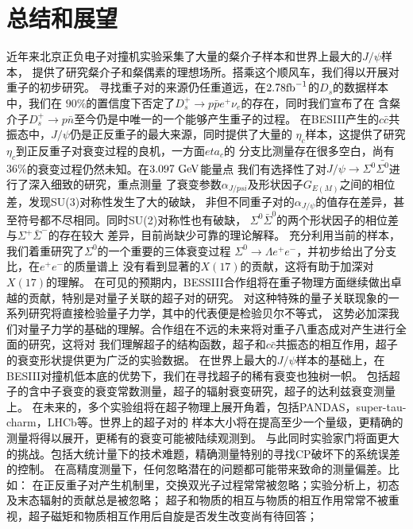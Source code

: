 ﻿\chapter{总结和展望}%
\label{sec:sunmmary}
近年来北京正负电子对撞机实验采集了大量的粲介子样本和世界上最大的$J/\psi$样本，
提供了研究粲介子和粲偶素的理想场所。搭乘这个顺风车，我们得以开展对重子的初步研究。
寻找重子对的来源仍任重道远，在$2.78 {\rm fb}^{-1}$的$D_{s}$的数据样本中，我们在
$90\%$的置信度下否定了$D_{s}^{+} \to p\bar{p} e^{+} \nu_{e}$的存在，同时我们宣布了在
含粲介子$D_{s}^{+} \to p \bar{n}$至今仍是中唯一的一个能够产生重子的过程。
在BESIII产生的$c\bar{c}$共振态中，$J/\psi$仍是正反重子的最大来源，同时提供了大量的
$\eta_{c}$样本，这提供了研究$\eta_{c}$到正反重子对衰变过程的良机，一方面$eta_{c}$的
分支比测量存在很多空白，尚有$36\%$的衰变过程仍然未知。在$3.097~{\rm GeV}$能量点
我们有选择性了对$J/\psi \to \Sigma^{0} \bar{\Sigma^{0}}$进行了深入细致的研究，重点测量
了衰变参数$\alpha_{J/psi}$及形状因子$G_{E(M)}$之间的相位差，发现SU(3)对称性发生了大的破缺，
非但不同重子对的$\alpha_{J/\psi}$的值存在差异，甚至符号都不尽相同。同时SU(2)对称性也有破缺，
$\Sigma^{0}\bar{\Sigma}^{0}$的两个形状因子的相位差与$\Sigma^{+} \bar{\Sigma}^{-}$的存在较大
差异，目前尚缺少可靠的理论解释。
充分利用当前的样本，我们着重研究了$\Sigma^{0}$的一个重要的三体衰变过程
$\Sigma^{0} \to \Lambda e^{+} e^{-}$，并初步给出了分支比，在$e^{+}e^{-}$的质量谱上
没有看到显著的$X(17)$的贡献，这将有助于加深对$X(17)$的理解。
在可见的预期内，BESSIII合作组将在重子物理方面继续做出卓越的贡献，特别是对量子关联的超子对的研究。
对这种特殊的量子关联现象的一系列研究将直接检验量子力学，其中的代表便是检验贝尔不等式，
这势必加深我们对量子力学的基础的理解。合作组在不远的未来将对重子八重态成对产生进行全面的研究，这将对
我们理解超子的结构函数，超子和$c\bar{c}$共振态的相互作用，超子的衰变形状提供更为广泛的实验数据。
在世界上最大的$J/\psi$样本的基础上，在BESIII对撞机低本底的优势下，我们在寻找超子的稀有衰变也独树一帜。
包括超子的含中子衰变的衰变常数测量，超子的辐射衰变研究，超子的达利兹衰变测量上。
在未来的，多个实验组将在超子物理上展开角着，包括PANDAS，super-tau-charm，LHCb等。世界上的超子对的
样本大小将在提高至少一个量级，更精确的测量将得以展开，更稀有的衰变可能被陆续观测到。
与此同时实验家门将面更大的挑战。包括大统计量下的技术难题，精确测量特别的寻找CP破坏下的系统误差的控制。
在高精度测量下，任何忽略潜在的问题都可能带来致命的测量偏差。比如：
在正反重子对产生机制里，交换双光子过程常常被忽略；实验分析上，初态及末态辐射的贡献总是被忽略；
超子和物质的相互与物质的相互作用常常不被重视，超子磁矩和物质相互作用后自旋是否发生改变尚有待回答；



